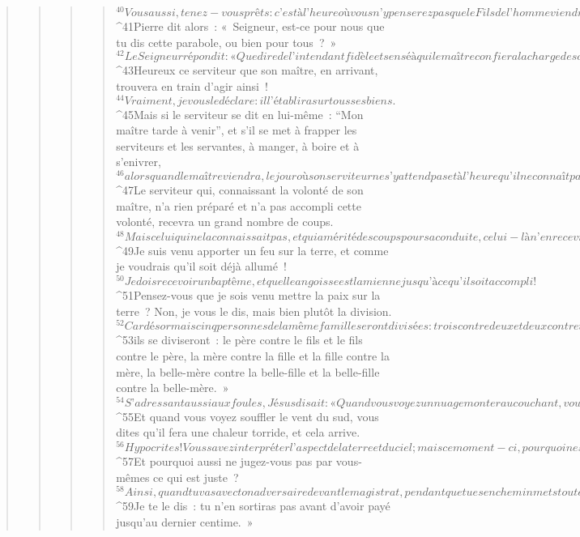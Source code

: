 \begin{verse}
\begin{verse}
\begin{verse}
\begin{verse}
${}^{40}Vous aussi, tenez-vous prêts : c’est à l’heure où vous n’y penserez pas que le Fils de l’homme viendra. »
${}^{41}Pierre dit alors : « Seigneur, est-ce pour nous que tu dis cette parabole, ou bien pour tous ? » 
${}^{42}Le Seigneur répondit : « Que dire de l’intendant fidèle et sensé à qui le maître confiera la charge de son personnel pour distribuer, en temps voulu, la ration de nourriture ? 
${}^{43}Heureux ce serviteur que son maître, en arrivant, trouvera en train d’agir ainsi ! 
${}^{44}Vraiment, je vous le déclare : il l’établira sur tous ses biens. 
${}^{45}Mais si le serviteur se dit en lui-même : “Mon maître tarde à venir”, et s’il se met à frapper les serviteurs et les servantes, à manger, à boire et à s’enivrer, 
${}^{46}alors quand le maître viendra, le jour où son serviteur ne s’y attend pas et à l’heure qu’il ne connaît pas, il l’écartera et lui fera partager le sort des infidèles.
${}^{47}Le serviteur qui, connaissant la volonté de son maître, n’a rien préparé et n’a pas accompli cette volonté, recevra un grand nombre de coups. 
${}^{48}Mais celui qui ne la connaissait pas, et qui a mérité des coups pour sa conduite, celui-là n’en recevra qu’un petit nombre. À qui l’on a beaucoup donné, on demandera beaucoup ; à qui l’on a beaucoup confié, on réclamera davantage.
${}^{49}Je suis venu apporter un feu sur la terre, et comme je voudrais qu’il soit déjà allumé ! 
${}^{50}Je dois recevoir un baptême, et quelle angoisse est la mienne jusqu’à ce qu’il soit accompli ! 
${}^{51}Pensez-vous que je sois venu mettre la paix sur la terre ? Non, je vous le dis, mais bien plutôt la division. 
${}^{52}Car désormais cinq personnes de la même famille seront divisées : trois contre deux et deux contre trois ; 
${}^{53}ils se diviseront : le père contre le fils et le fils contre le père, la mère contre la fille et la fille contre la mère, la belle-mère contre la belle-fille et la belle-fille contre la belle-mère. »
${}^{54}S’adressant aussi aux foules, Jésus disait : « Quand vous voyez un nuage monter au couchant, vous dites aussitôt qu’il va pleuvoir, et c’est ce qui arrive. 
${}^{55}Et quand vous voyez souffler le vent du sud, vous dites qu’il fera une chaleur torride, et cela arrive. 
${}^{56}Hypocrites ! Vous savez interpréter l’aspect de la terre et du ciel ; mais ce moment-ci, pourquoi ne savez-vous pas l’interpréter ?
${}^{57}Et pourquoi aussi ne jugez-vous pas par vous-mêmes ce qui est juste ? 
${}^{58}Ainsi, quand tu vas avec ton adversaire devant le magistrat, pendant que tu es en chemin mets tout en œuvre pour t’arranger avec lui, afin d’éviter qu’il ne te traîne devant le juge, que le juge ne te livre à l’huissier, et que l’huissier ne te jette en prison. 
${}^{59}Je te le dis : tu n’en sortiras pas avant d’avoir payé jusqu’au dernier centime. »
      

\end{verse}
\end{verse}
\end{verse}
\end{verse}
